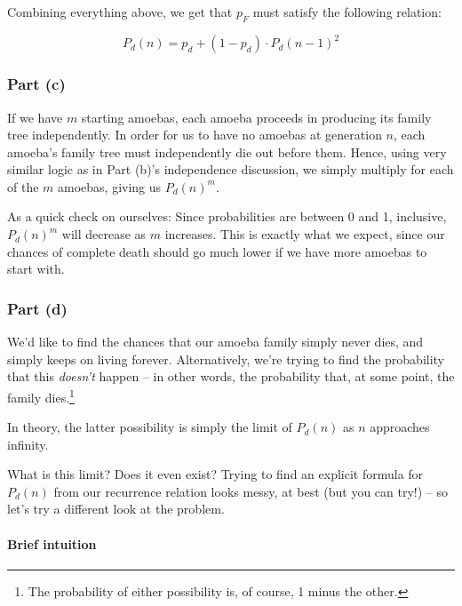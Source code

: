 
Combining everything above, we get that $p_F$ must satisfy the following relation:

\begin{equation}
P_d(n) = p_d + (1-p_d) \cdot P_d(n-1)^2
\end{equation}


\subsubsection{Part (c)}

If we have $m$ starting amoebas, each amoeba proceeds in producing its family tree independently. In order for us to have no amoebas at generation $n$, each amoeba's family tree must independently die out before them. Hence, using very similar logic as in Part (b)'s independence discussion, we simply multiply for each of the $m$ amoebas, giving us $P_d(n)^m$. 

As a quick check on ourselves: Since probabilities are between 0 and 1, inclusive, $P_d(n)^m$ will decrease as $m$ increases. This is exactly what we expect, since our chances of complete death should go much lower if we have more amoebas to start with.


\subsubsection{Part (d)}

We'd like to find the chances that our amoeba family simply never dies, and simply keeps on living forever. Alternatively, we're trying to find the probability that this \emph{doesn't} happen -- in other words, the probability that, at some point, the family dies.\footnote{The probability of either possibility is, of course, 1 minus the other.}

In theory, the latter possibility is simply the limit of $P_d(n)$ as $n$ approaches infinity. 

What is this limit? Does it even exist? Trying to find an explicit formula for $P_d(n)$ from our recurrence relation looks messy, at best (but you can try!) -- so let's try a different look at the problem.


\paragraph{Brief intuition}

